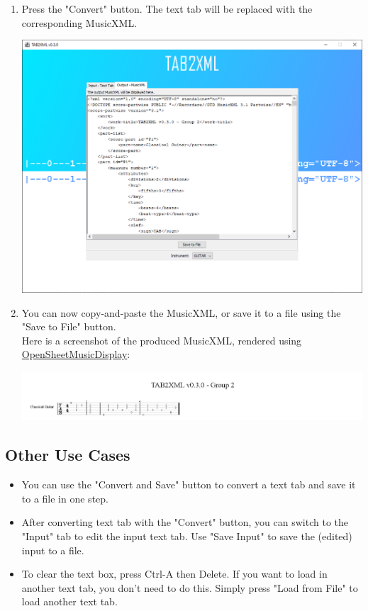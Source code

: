 \documentclass[11pt]{article}
\begin{document}
\begin{enumerate}
\begin{center}
\end{center}
\item Press the "Convert" button.  The text tab will be replaced with the corresponding MusicXML.
\begin{center}
\includegraphics[width=.9\linewidth]{../Screenshots/converted-20210317-tabbedview.png}
\end{center}
\item You can now copy-and-paste the MusicXML, or save it to a file using the "Save to File" button. \\
Here is a screenshot of the produced MusicXML, rendered using \href{https://opensheetmusicdisplay.github.io/demo/}{OpenSheetMusicDisplay}:
\begin{center}
\includegraphics[width=.9\linewidth]{../Screenshots/converted-20210317-opensheetmusicdisplay.png}
\end{center}
\end{enumerate}
\subsection{Other Use Cases}
\label{sec:orgd4f2fe4}
\begin{itemize}
\item You can use the "Convert and Save" button to convert a text tab and save it to a file in one step.
\item After converting text tab with the "Convert" button, you can switch to the "Input" tab to edit the input text tab.  Use "Save Input" to save the (edited) input to a file.
\item To clear the text box, press Ctrl-A then Delete.  If you want to load in another text tab, you don't need to do this.  Simply press "Load from File" to load another text tab.
\end{itemize}
\end{document}
